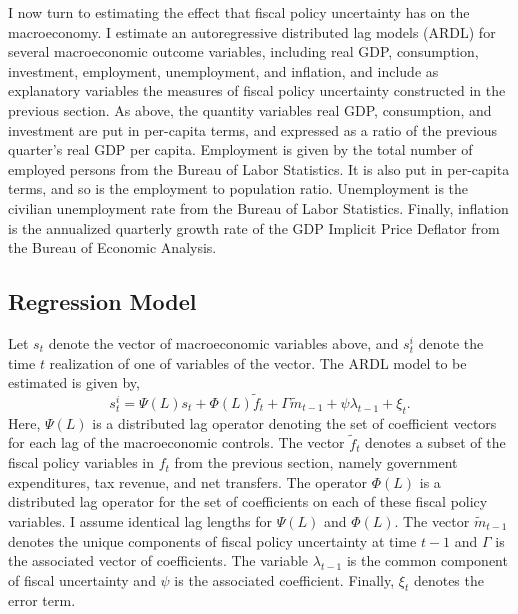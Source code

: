 \documentclass[11pt]{article}
\newcommand{\beq}{\begin{equation}}
\newcommand{\eeq}{\end{equation}}
\begin{document}
I now turn to estimating the effect that fiscal policy uncertainty has on the macroeconomy.  I estimate an autoregressive distributed lag models (ARDL) for several macroeconomic outcome variables, including real GDP, consumption, investment, employment, unemployment, and inflation, and include as explanatory variables the measures of fiscal policy uncertainty constructed in the previous section.  As above, the quantity variables real GDP, consumption, and investment are put in per-capita terms, and expressed as a ratio of the previous quarter's real GDP per capita.  Employment is given by the total number of employed persons from the Bureau of Labor Statistics.  It is also put in per-capita terms, and so is the employment to population ratio.  Unemployment is the civilian unemployment rate from the Bureau of Labor Statistics.  Finally, inflation is the annualized quarterly growth rate of the GDP Implicit Price Deflator from the Bureau of Economic Analysis.

\subsection{Regression Model}

Let $s_t$ denote the vector of macroeconomic variables above, and $s_t^i$ denote the time $t$ realization of one of variables of the vector.  The ARDL model to be estimated is given by,
\beq \label{eg:ardl} s_t^i = \Psi(L)s_t + \Phi(L)\tilde{f}_t + \Gamma \tilde{m}_{t-1} + \psi \lambda_{t-1} + \xi_t. \eeq
Here, $\Psi(L)$ is a distributed lag operator denoting the set of coefficient vectors for each lag of the macroeconomic controls.  The vector $\tilde{f}_t$ denotes a subset of the fiscal policy variables in $f_t$ from the previous section, namely government expenditures, tax revenue, and net transfers.  The operator $\Phi(L)$ is a distributed lag operator for the set of coefficients on each of these fiscal policy variables.  I assume identical lag lengths for $\Psi(L)$ and $\Phi(L)$.  The vector $\tilde{m}_{t-1}$ denotes the unique components of fiscal policy uncertainty at time $t-1$ and $\Gamma$ is the associated vector of coefficients.  The variable $\lambda_{t-1}$ is the common component of fiscal uncertainty and $\psi$ is the associated coefficient.  Finally, $\xi_t$ denotes the error term.  
\end{document}
